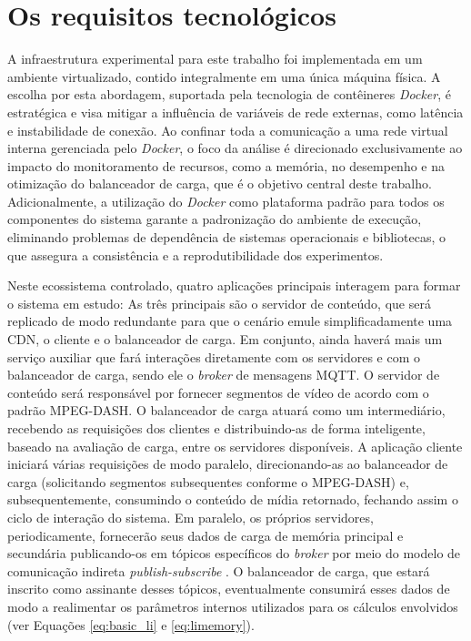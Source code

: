 \section{Os requisitos tecnológicos} \label{sec:ambiente}

A infraestrutura experimental para este trabalho foi implementada em um ambiente virtualizado, contido integralmente em uma única máquina física. A escolha por esta abordagem, suportada pela tecnologia de contêineres \textit{Docker}, é estratégica e visa mitigar a influência de variáveis de rede externas, como latência e instabilidade de conexão. Ao confinar toda a comunicação a uma rede virtual interna gerenciada pelo \textit{Docker}, o foco da análise é direcionado exclusivamente ao impacto do monitoramento de recursos, como a memória, no desempenho e na otimização do balanceador de carga, que é o objetivo central deste trabalho. Adicionalmente, a utilização do \textit{Docker} como plataforma padrão para todos os componentes do sistema garante a padronização do ambiente de execução, eliminando problemas de dependência de sistemas operacionais e bibliotecas, o que assegura a consistência e a reprodutibilidade dos experimentos.

Neste ecossistema controlado, quatro aplicações principais interagem para formar o sistema em estudo: As três principais são o servidor de conteúdo, que será replicado de modo redundante para que o cenário emule simplificadamente uma CDN, o cliente e o balanceador de carga. Em conjunto, ainda haverá mais um serviço auxiliar que fará interações diretamente com os servidores e com o balanceador de carga, sendo ele o \textit{broker} de mensagens MQTT. O servidor de conteúdo será responsável por fornecer segmentos de vídeo de acordo com o padrão MPEG-DASH. O balanceador de carga atuará como um intermediário, recebendo as requisições dos clientes e distribuindo-as de forma inteligente, baseado na avaliação de carga, entre os servidores disponíveis. A aplicação cliente iniciará várias requisições de modo paralelo, direcionando-as ao balanceador de carga (solicitando segmentos subsequentes conforme o MPEG-DASH) e, subsequentemente, consumindo o conteúdo de mídia retornado, fechando assim o ciclo de interação do sistema. Em paralelo, os próprios servidores, periodicamente, fornecerão seus dados de carga de memória principal e secundária publicando-os em tópicos específicos do \textit{broker} por meio do modelo de comunicação indireta \textit{publish-subscribe} \cite{eugster2003many}. O balanceador de carga, que estará inscrito como assinante desses tópicos, eventualmente consumirá esses dados de modo a realimentar os parâmetros internos utilizados para os cálculos envolvidos (ver Equações \ref{eq:basic_li} e \ref{eq:limemory}).


